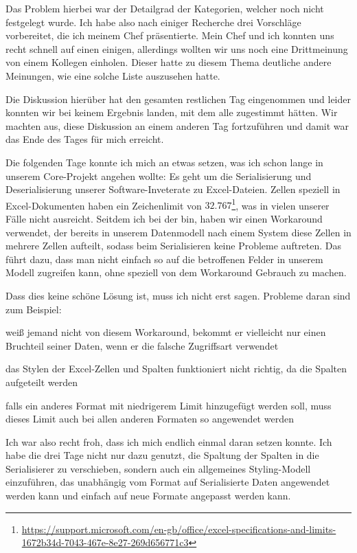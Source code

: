 Das Problem hierbei war der Detailgrad der Kategorien, welcher noch nicht festgelegt wurde.
Ich habe also nach einiger Recherche drei Vorschläge vorbereitet, die ich meinem Chef präsentierte.
Mein Chef und ich konnten uns recht schnell auf einen einigen, allerdings wollten wir uns noch eine Drittmeinung von einem Kollegen einholen.
Dieser hatte zu diesem Thema deutliche andere Meinungen, wie eine solche Liste auszusehen hatte.

Die Diskussion hierüber hat den gesamten restlichen Tag eingenommen und leider konnten wir bei keinem Ergebnis landen, mit dem alle zugestimmt hätten.
Wir machten aus, diese Diskussion an einem anderen Tag fortzuführen und damit war das Ende des Tages für mich erreicht.


Die folgenden Tage konnte ich mich an etwas setzen, was ich schon lange in unserem Core-Projekt angehen wollte:
Es geht um die Serialisierung und Deserialisierung unserer Software-Inveterate zu Excel-Dateien.
Zellen speziell in Excel-Dokumenten haben ein Zeichenlimit von $32.767$\footnote{\url{https://support.microsoft.com/en-gb/office/excel-specifications-and-limits-1672b34d-7043-467e-8e27-269d656771c3}}, was in vielen unserer Fälle nicht ausreicht.
Seitdem ich bei der \metaeffekt bin, haben wir einen Workaround verwendet, der bereits in unserem Datenmodell nach einem System diese Zellen in mehrere Zellen aufteilt, sodass beim Serialisieren keine Probleme auftreten.
Das führt dazu, dass man nicht einfach so auf die betroffenen Felder in unserem Modell zugreifen kann, ohne speziell von dem Workaround Gebrauch zu machen.

Dass dies keine schöne Lösung ist, muss ich nicht erst sagen.
Probleme daran sind zum Beispiel:

\begin{smitemize}
    \item weiß jemand nicht von diesem Workaround, bekommt er vielleicht nur einen Bruchteil seiner Daten, wenn er die falsche Zugriffsart verwendet
    \item das Stylen der Excel-Zellen und Spalten funktioniert nicht richtig, da die Spalten aufgeteilt werden
    \item falls ein anderes Format mit niedrigerem Limit hinzugefügt werden soll, muss dieses Limit auch bei allen anderen Formaten so angewendet werden
\end{smitemize}

Ich war also recht froh, dass ich mich endlich einmal daran setzen konnte.
Ich habe die drei Tage nicht nur dazu genutzt, die Spaltung der Spalten in die Serialisierer zu verschieben, sondern auch ein allgemeines Styling-Modell einzuführen, das unabhängig vom Format auf Serialisierte Daten angewendet werden kann und einfach auf neue Formate angepasst werden kann.

